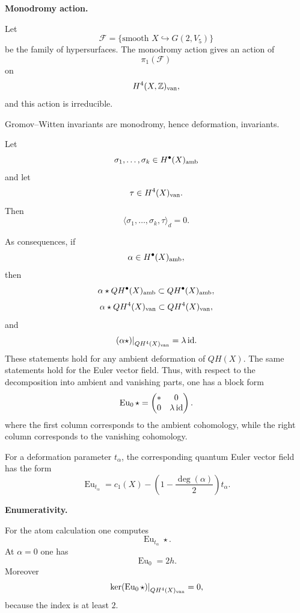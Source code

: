 \medskip\noindent
{\bf Monodromy action.}

Let
\[
        \mathcal F
        =
        \{
        \text{smooth }
        X\hookrightarrow G(2,V_5)
        \}
\]
be the family of hypersurfaces.
The monodromy action gives an action
of
\[
        \pi_1(\mathcal F)
\]
on
\[
        H^4(X,\mathbb Z)_{\rm van},
\]
and this action is irreducible.

Gromov--Witten invariants are
monodromy, hence deformation,
invariants.

\begin{lemma}
\label{lemma-let-1}
Let
\[
        \sigma_1,\ldots,\sigma_k
        \in H^\bullet(X)_{\rm amb}
\]
and let
\[
        \tau\in H^4(X)_{\rm van}.
\]
Then
\[
        \langle
        \sigma_1,\ldots,\sigma_k,\tau
        \rangle_d=0.
\]
\end{lemma}

As consequences, if
\[
        \alpha\in H^\bullet(X)_{\rm amb},
\]
then
\[
        \alpha\star QH^\bullet(X)_{\rm amb}
        \subset QH^\bullet(X)_{\rm amb},
\]
\[
        \alpha\star QH^4(X)_{\rm van}
        \subset QH^4(X)_{\rm van},
\]
and
\[
        \left.
        (\alpha\star)
        \right|_{QH^4(X)_{\rm van}}
        =
        \lambda\,{\rm id}.
\]
These statements hold for any ambient
deformation of $QH(X)$.
The same statements hold for the
Euler vector field.
Thus, with respect to the
decomposition into ambient and
vanishing parts, one has a block form
\[
        \operatorname{Eu}_0\star
        =
        \begin{pmatrix}
        * & 0\\
        0 & \lambda\,{\rm id}
        \end{pmatrix}.
\]
where the first column corresponds
to the ambient cohomology,
while the right column
corresponds to the vanishing cohomology.

For a deformation parameter
$t_\alpha$, the corresponding quantum
Euler vector field has the form
\[
        \operatorname{Eu}_{t_\alpha}
        =
        c_1(X)
        -
        \left(1-
        \frac{\deg(\alpha)}{2}
        \right)t_\alpha .
\]

\medskip\noindent
{\bf Enumerativity.}

For the atom calculation one computes
\[
        \operatorname{Eu}_{t_\alpha}\star.
\]
At $\alpha=0$ one has
\[
        \operatorname{Eu}_0=2h.
\]
Moreover
\[
        \left.
        \ker(\operatorname{Eu}_0\star)
        \right|_{QH^4(X)_{\rm van}}
        =
        0,
\]
because the index is at least $2$.

